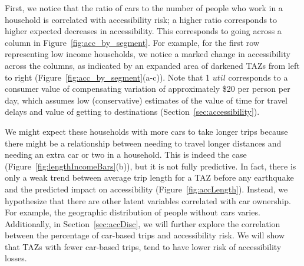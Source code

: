 First, we notice that the ratio of cars to the number of people who work in a household is  correlated with accessibility risk; a higher ratio corresponds to higher expected decreases in accessibility. This corresponds to going across a column in Figure~\ref{fig:acc_by_segment}. For example, for the first row representing low income households, 
 we notice a marked change in accessibility across the columns, as indicated by an expanded area of darkened TAZs from left to right (Figure~\ref{fig:acc_by_segment}{(a-c)}). Note that 1 $util$ corresponds to a consumer value of compensating variation of approximately \$20 per person per day, which assumes low (conservative) estimates of the value of time for travel delays and value of getting to destinations (Section~\ref{sec:accessibility}). 
 
We might expect these households with more cars to take longer trips because there might be a relationship between needing to travel longer distances and needing an extra car or two in a household. This is indeed the case (Figure~\ref{fig:lengthIncomeBars}{(b)}), but it is not fully predictive. In fact, there is only a weak trend between average trip length for a TAZ before any earthquake and the predicted impact on accessibility (Figure~\ref{fig:accLength}). Instead, we hypothesize that there are other latent variables correlated with car ownership. For example, the geographic distribution of people without cars varies. Additionally, in Section~\ref{sec:accDisc}, we will further explore the correlation between the percentage of car-based trips and accessibility risk. We will show that TAZs with fewer car-based trips, tend to have lower risk of accessibility losses.



